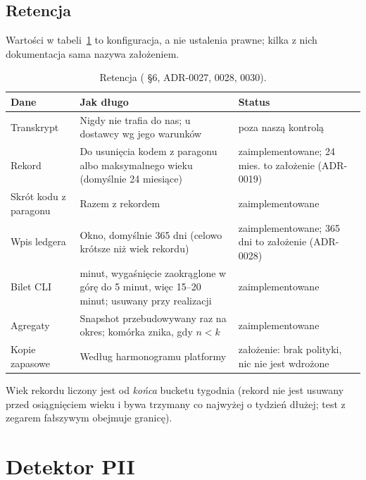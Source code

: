 \subsection{Retencja}

Wartości w tabeli~\ref{tab:p3-retencja} to konfiguracja, a nie ustalenia
prawne; kilka z nich dokumentacja sama nazywa założeniem.

\begin{table}[htbp]
\centering
\small
\begin{tabularx}{\linewidth}{@{}>{\raggedright\arraybackslash}p{3.3cm}>{\raggedright\arraybackslash}X>{\raggedright\arraybackslash}p{3.1cm}@{}}
\toprule
\textbf{Dane} & \textbf{Jak długo} & \textbf{Status} \\
\midrule
Transkrypt & Nigdy nie trafia do nas; u dostawcy wg jego warunków & poza naszą kontrolą \\
Rekord & Do usunięcia kodem z paragonu albo maksymalnego wieku (domyślnie 24 miesiące) & zaimplementowane; 24 mies. to założenie (ADR-0019) \\
Skrót kodu z paragonu & Razem z rekordem & zaimplementowane \\
Wpis ledgera & Okno, domyślnie 365 dni (celowo krótsze niż wiek rekordu) & zaimplementowane; 365 dni to założenie (ADR-0028) \\
Bilet CLI & 15 minut, wygaśnięcie zaokrąglone w górę do 5 minut, więc 15--20 minut; usuwany przy realizacji & zaimplementowane \\
Agregaty & Snapshot przebudowywany raz na okres; komórka znika, gdy $n<k$ & zaimplementowane \\
Kopie zapasowe & Według harmonogramu platformy & założenie: brak polityki, nic nie jest wdrożone \\
\bottomrule
\end{tabularx}
\caption{Retencja ( §6, ADR-0027, 0028, 0030).}
\label{tab:p3-retencja}
\end{table}

Wiek rekordu liczony jest od \emph{końca} bucketu tygodnia (rekord nie jest
usuwany przed osiągnięciem wieku i bywa trzymany co najwyżej o tydzień dłużej;
test z zegarem fałszywym obejmuje granicę).

\section{Detektor PII}
\label{sec:p3-pii}

